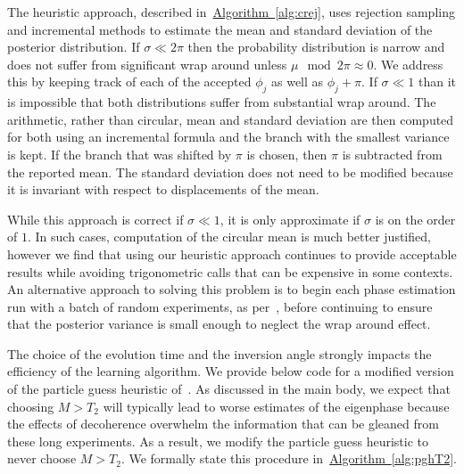 \documentclass[aps,pra,amsmath,twocolumn,amssymb,superscriptaddress]{revtex4-1}
\newcommand{\alg}[1]{\hyperref[alg:#1]{Algorithm~\ref*{alg:#1}}}
\begin{document}
The heuristic approach, described in~\alg{crej}, uses rejection sampling and incremental methods to estimate the mean and standard deviation of the posterior distribution.  If $\sigma\ll 2\pi$ then the probability distribution is narrow and does not suffer from significant wrap around unless $\mu \mod 2\pi \approx 0$.  We address this by keeping track of each of the accepted $\phi_j$ as well as $\phi_j+\pi$.  If $\sigma\ll 1$ than it is impossible that both distributions suffer from substantial wrap around.  The arithmetic, rather than circular, mean and standard deviation are then computed for both using an incremental formula and the branch with the smallest variance is kept.  If the branch that was shifted by $\pi$ is chosen, then $\pi$ is subtracted from the reported mean.  The standard deviation does not need to be modified because it is invariant with respect to displacements of the mean.

While this approach is correct if $\sigma\ll 1$, it is only approximate if $\sigma$ is on the order of $1$.  In such cases, computation of the circular mean is much better justified, however we find that using our heuristic approach continues to provide acceptable results while avoiding trigonometric calls that can be expensive in some contexts.  An alternative approach to solving this problem is to begin each phase estimation run with a batch of random experiments, as per~\cite{SHF14}, before continuing to ensure that the posterior variance is small enough to neglect the wrap around effect.

The choice of the evolution time and the inversion angle strongly impacts the efficiency of the learning algorithm.  We provide below code for a modified version of the
particle guess heuristic of~\cite{wiebe_hamiltonian_2014}.  As discussed in the main body, we expect that choosing $M> T_2$ will typically lead to worse estimates of the eigenphase because the effects of decoherence overwhelm the information that can be gleaned from these long experiments.  As a result, we modify the particle guess heuristic  to never choose $M> T_2$.  We formally state this procedure in~\alg{pghT2}.
\end{document}

